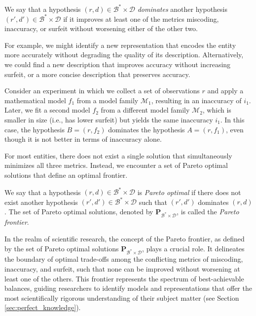 \begin{definition}
We say that a hypothesis $(r, d) \in \mathcal{B}^\ast \times \mathcal{D}$ \emph{dominates} another hypothesis $(r', d') \in \mathcal{B}^\ast \times \mathcal{D}$ if it improves at least one of the metrics miscoding, inaccuracy, or surfeit without worsening either of the other two.
\end{definition}

For example, we might identify a new representation that encodes the entity more accurately without degrading the quality of its description. Alternatively, we could find a new description that improves accuracy without increasing surfeit, or a more concise description that preserves accuracy.

\begin{example}
\label{ex:nescience_pareto}
Consider an experiment in which we collect a set of observations $r$ and apply a mathematical model $f_1$ from a model family $\mathcal{M}_1$, resulting in an inaccuracy of $i_1$. Later, we fit a second model $f_2$ from a different model family $\mathcal{M}_2$, which is smaller in size (i.e., has lower surfeit) but yields the same inaccuracy $i_1$. In this case, the hypothesis $B = (r, f_2)$ dominates the hypothesis $A = (r, f_1)$, even though it is not better in terms of inaccuracy alone.
\end{example}

For most entities, there does not exist a single solution that simultaneously minimizes all three metrics. Instead, we encounter a set of Pareto optimal solutions that define an optimal frontier.

\begin{definition}
We say that a hypothesis $(r, d) \in \mathcal{B}^\ast \times \mathcal{D}$ is \emph{Pareto optimal} if there does not exist another hypothesis $(r', d') \in \mathcal{B}^\ast \times \mathcal{D}$ such that $(r', d')$ dominates $(r, d)$. The set of Pareto optimal solutions, denoted by $\mathbf{P}_{\mathcal{B}^\ast \times \mathcal{D}}$, is called the \emph{Pareto frontier}.
\end{definition}

In the realm of scientific research, the concept of the Pareto frontier, as defined by the set of Pareto optimal solutions $\mathbf{P}_{\mathcal{B}^\ast \times \mathcal{D}}$, plays a crucial role. It delineates the boundary of optimal trade-offs among the conflicting metrics of miscoding, inaccuracy, and surfeit, such that none can be improved without worsening at least one of the others. This frontier represents the spectrum of best-achievable balances, guiding researchers to identify models and representations that offer the most scientifically rigorous understanding of their subject matter (see Section \ref{sec:perfect_knowledge}).

